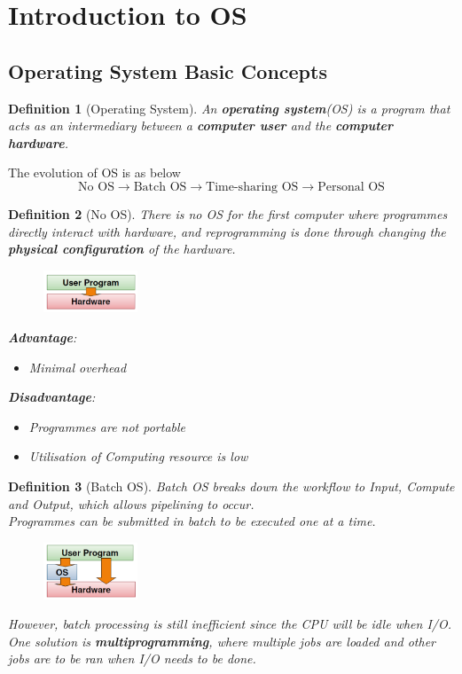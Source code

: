 \documentclass[11pt]{article}
\newtheorem{definition}{Definition}[section]
\theoremstyle{definition}
\begin{document}
\twocolumn
\section{Introduction to OS}
\subsection{Operating System Basic Concepts}
\begin{definition}[Operating System]
\normalfont An \textbf{operating system}(OS) is a program that acts as an intermediary between a \textbf{computer user} and the \textbf{computer hardware}.
\end{definition}
The evolution of OS is as below
\[
\text{No OS}\to\text{Batch OS}\to\text{Time-sharing OS}\to\text{Personal OS}
\]
\begin{definition}[No OS]
\normalfont There is no OS for the first computer where programmes \textit{directly} interact with hardware, and reprogramming is done through changing the \textbf{physical configuration} of the hardware.\\
\begin{figure}[h]
\centering
\includegraphics[width = 0.25\textwidth]{1_1.png}
\end{figure}
\textbf{Advantage}:
\begin{itemize}[itemsep=0pt]
  \item Minimal overhead
\end{itemize}
\textbf{Disadvantage}:
\begin{itemize}[itemsep=0pt]
  \item Programmes are not portable
  \item Utilisation of Computing resource is low
\end{itemize}
\end{definition}
\begin{definition}[Batch OS]
\normalfont Batch OS breaks down the workflow to Input, Compute and Output, which allows pipelining to occur.\\
Programmes can be \textit{submitted in batch} to be \textit{executed one at a time}. \\
\begin{figure}[h]
\centering
\includegraphics[width = 0.25\textwidth]{1_2.png}
\end{figure}
However, batch processing is still inefficient since the CPU will be idle when I/O. One solution is \textbf{multiprogramming}, where multiple jobs are loaded and other jobs are to be ran when I/O needs to be done.
\end{definition}
\end{document}
